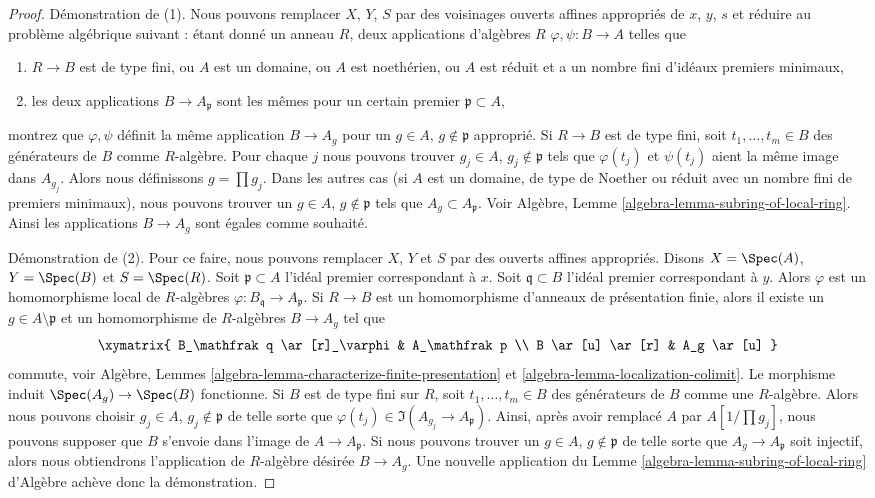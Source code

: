 \begin{proof}
Démonstration de (1). Nous pouvons remplacer $X$, $Y$, $S$ par des voisinages
ouverts affines appropriés de $x$, $y$, $s$ et réduire au problème algébrique
suivant : étant donné un anneau $R$, deux applications d'algèbres $R$ $\varphi, \psi : B \to A$
telles que
\begin{enumerate}
\item $R \to B$ est de type fini, ou $A$ est un domaine, ou $A$
est noethérien, ou $A$ est réduit et a un nombre fini d'idéaux premiers minimaux,
\item les deux applications $B \to A_\mathfrak p$ sont les mêmes pour
un certain premier $\mathfrak p \subset A$,
\end{enumerate}
montrez que $\varphi, \psi$ définit la même application $B \to A_g$
pour un $g \in A$, $g \not \in \mathfrak p$ approprié. Si $R \to B$ est de type
fini, soit $t_1, \ldots, t_m \in B$ des générateurs de $B$ comme $R$-algèbre.
Pour chaque $j$ nous
pouvons trouver $g_j \in A$, $g_j \not \in \mathfrak p$
tels que $\varphi(t_j)$ et $\psi(t_j)$ aient la même image dans
$A_{g_j}$. Alors nous définissons $g = \prod g_j$.
Dans les autres cas (si $A$ est un domaine, de
type de Noether ou réduit avec un nombre fini de premiers minimaux),
nous pouvons trouver un $g \in A$, $g \not \in \mathfrak p$ tels que
$A_g \subset A_\mathfrak p$. Voir Algèbre, Lemme \ref{algebra-lemma-subring-of-local-ring}. Ainsi les applications
$B \to A_g$ sont égales comme souhaité.

\medskip\noindent
Démonstration de (2). Pour ce faire, nous pouvons remplacer $X$, $Y$ et $S$
par des ouverts affines appropriés. Disons $X = \Spec(A)$,
$Y = \Spec(B)$ et $S = \Spec(R)$. Soit $\mathfrak p \subset A$ l'idéal premier correspondant
à $x$. Soit $\mathfrak q \subset B$ l'idéal premier correspondant à $y$.
Alors $\varphi$ est un homomorphisme local de $R$-algèbres
$\varphi : B_\mathfrak q \to A_\mathfrak p$. Si $R \to B$
est un homomorphisme d'anneaux de présentation finie, alors il existe
un $g \in A \setminus \mathfrak p$ et un homomorphisme de $R$-algèbres $B \to A_g$ tel que
$$
\xymatrix{
B_\mathfrak q \ar[r]_\varphi & A_\mathfrak p \\
B \ar[u] \ar[r] & A_g \ar[u]
}
$$
commute, voir
Algèbre, Lemmes \ref{algebra-lemma-characterize-finite-presentation} et \ref{algebra-lemma-localization-colimit}. Le morphisme induit
$\Spec(A_g) \to \Spec(B)$ fonctionne. Si $B$
est de type fini sur $R$, soit $t_1, \ldots, t_m \in B$
des générateurs de $B$ comme une $R$-algèbre.
Alors nous pouvons choisir $g_j \in A$, $g_j \not \in \mathfrak p$
de telle sorte que $\varphi(t_j) \in \Im(A_{g_j} \to A_\mathfrak p)$.
Ainsi, après avoir remplacé $A$ par $A[1/\prod g_j]$,
nous pouvons supposer que $B$ s'envoie
dans l'image de $A \to A_\mathfrak p$. Si nous pouvons
trouver un $g \in A$, $g \not \in \mathfrak p$ de telle
sorte que $A_g \to A_\mathfrak p$ soit injectif, alors
nous obtiendrons l'application de $R$-algèbre
désirée $B \to A_g$. Une nouvelle application du
Lemme \ref{algebra-lemma-subring-of-local-ring} d'Algèbre achève donc la démonstration.
\end{proof}

